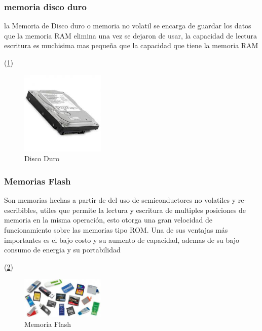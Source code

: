 \documentclass{article}
\begin{document}
        \subsubsection{memoria disco duro}
        la Memoria de Disco duro o memoria no volatil se encarga de guardar los datos que la memoria RAM elimina una vez se dejaron de usar, la capacidad de lectura  escritura es muchisima mas pequeña que la capacidad que tiene la memoria RAM
        
        (\ref{fig:discoDuro})
        \begin{figure}[h]
        \includegraphics[width=4cm]{discoDuro.jpg}
        \centering
        \caption{Disco Duro}
        \label{fig:discoDuro}
        \end{figure}
        
        
        \subsubsection{Memorias Flash}
        Son memorias hechas a partir de del uso de semiconductores no volatiles y re-escribibles, utiles que permite la lectura y escritura de multiples posiciones de memoria en la misma operación, esto otorga una gran velocidad de funcionamiento sobre las memorias tipo ROM. Una de sus ventajas más importantes es el bajo costo y su aumento de capacidad, ademas de su bajo consumo de energia y su portabilidad 
        
        (\ref{fig:flash})
        \begin{figure}[h]
        \includegraphics[width=4cm]{flash.jpg}
        \centering
        \caption{Memoria Flash}
        \label{fig:flash}
        \end{figure}
    
    
\end{document}
